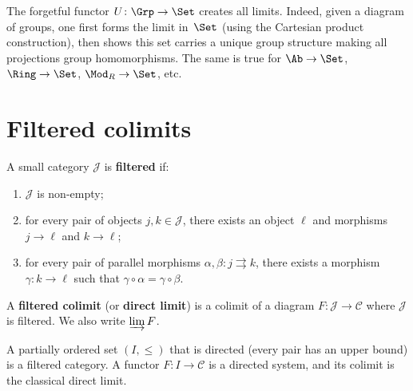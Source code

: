 \begin{example}\label{ex:forgetful-creates}
The forgetful functor $U\colon\Grp\to\Set$ creates all limits.
Indeed, given a diagram of groups, one first forms the limit in~$\Set$
(using the Cartesian product construction), then shows this set carries
a unique group structure making all projections group homomorphisms.
The same is true for $\Ab\to\Set$, $\Ring\to\Set$, $\Mod_R\to\Set$, etc.
\end{example}


\section{Filtered colimits}\label{sec:filtered-colimits}

\begin{definition}\label{def:filtered-category}
A small category $\mathcal{J}$ is \textbf{filtered} if:
\begin{enumerate}[label=(\roman*)]
\item $\mathcal{J}$ is non-empty;
\item for every pair of objects $j,k\in\mathcal{J}$, there exists
      an object $\ell$ and morphisms $j\to\ell$ and $k\to\ell$;
\item for every pair of parallel morphisms $\alpha,\beta\colon j\rightrightarrows k$,
      there exists a morphism $\gamma\colon k\to\ell$ such that
      $\gamma\circ\alpha = \gamma\circ\beta$.
\end{enumerate}
\end{definition}

\begin{definition}\label{def:filtered-colimit}
A \textbf{filtered colimit} (or \textbf{direct limit}) is a colimit
of a diagram $F\colon\mathcal{J}\to\mathcal{C}$ where $\mathcal{J}$
is filtered.  We also write $\varinjlim F$.
\end{definition}

\begin{example}\label{ex:filtered-colimit-directed}
A partially ordered set $(I,\leq)$ that is directed
(every pair has an upper bound) is a filtered category.
A functor $F\colon I\to\mathcal{C}$ is a directed system,
and its colimit is the classical direct limit.
\end{example}

